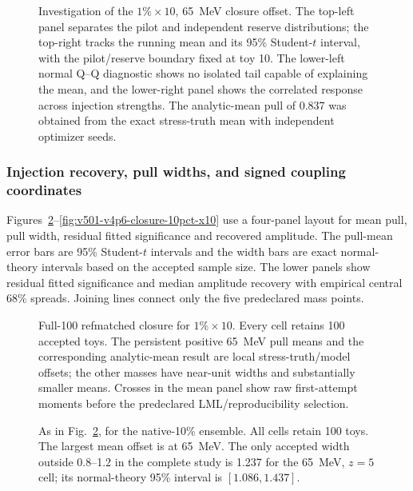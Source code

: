 \begin{figure}[p]
\centering
{}
\caption{Investigation of the $1\%\times10$, 65~MeV closure offset.  The top-left
panel separates the pilot and independent reserve distributions; the top-right tracks
the running mean and its 95\% Student-$t$ interval, with the pilot/reserve boundary
fixed at toy 10.  The lower-left normal Q--Q diagnostic shows no isolated tail capable
of explaining the mean, and the lower-right panel shows the correlated response across
injection strengths.  The analytic-mean pull of 0.837 was obtained from the exact
stress-truth mean with independent optimizer seeds.}
\label{fig:v501-v4p6-bias-confirmation}
\end{figure}

\subsubsection{Injection recovery, pull widths, and signed coupling coordinates}

Figures~\ref{fig:v501-v4p6-closure-1pct-x10}--\ref{fig:v501-v4p6-closure-10pct-x10}
use a four-panel layout for mean pull, pull width, residual fitted
significance and recovered amplitude.  The pull-mean error bars are 95\% Student-$t$
intervals and the width bars are exact normal-theory intervals based on the accepted
sample size.  The lower panels show residual fitted significance and median amplitude
recovery with empirical central 68\% spreads.  Joining lines connect only the five
predeclared mass points.

\begin{figure}[p]
\centering
{}
\caption{Full-100 refmatched closure for $1\%\times10$.  Every cell retains 100
accepted toys.  The persistent positive 65~MeV pull means and the corresponding
analytic-mean result are local stress-truth/model offsets; the other masses have
near-unit widths and substantially smaller means.  Crosses in the mean panel show raw
first-attempt moments before the predeclared LML/reproducibility selection.}
\label{fig:v501-v4p6-closure-1pct-x10}
\end{figure}

\begin{figure}[p]
\centering
{}
\caption{As in Fig.~\ref{fig:v501-v4p6-closure-1pct-x10}, for the native-10\% ensemble.
All cells retain 100 toys.  The largest mean offset is at 65~MeV.  The only accepted
width outside 0.8--1.2 in the complete study is 1.237 for the 65~MeV, $z=5$ cell; its
normal-theory 95\% interval is $[1.086,1.437]$.}
\label{fig:v501-v4p6-closure-10pct}
\end{figure}

